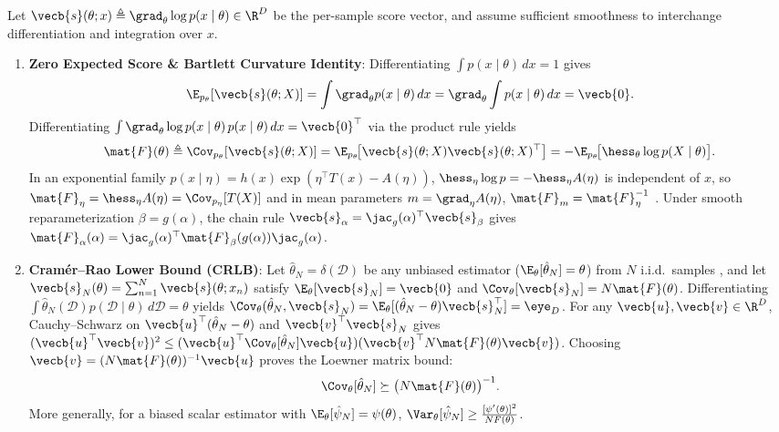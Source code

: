 \documentclass[../../../../master.tex]{subfiles}
\begin{document}
\begin{coremath}
Let $\vecb{s}(\theta; x) \triangleq \grad_\theta \log p(x \mid \theta) \in \R^D$ be the per-sample score vector, and assume sufficient smoothness to interchange differentiation and integration over $x$.
\begin{enumerate}
  \item \textbf{Zero Expected Score \& Bartlett Curvature Identity}: Differentiating $\int p(x\mid\theta)\,dx = 1$ gives
  \begin{equation}
  \E_{p_\theta}[\vecb{s}(\theta; X)] = \int \grad_\theta p(x\mid\theta)\,dx = \grad_\theta \int p(x\mid\theta)\,dx = \vecb{0}.
  \end{equation}
  Differentiating $\int \grad_\theta \log p(x\mid\theta)\, p(x\mid\theta)\,dx = \vecb{0}^\top$ via the product rule yields
  \begin{equation}
  \label{eq:asymp:fim}
  \mat{F}(\theta) \triangleq \Cov_{p_\theta}[\vecb{s}(\theta; X)] = \E_{p_\theta}\!\bigl[\vecb{s}(\theta; X)\vecb{s}(\theta; X)^\top\bigr] = -\E_{p_\theta}\!\bigl[\hess_\theta \log p(X \mid \theta)\bigr].
  \end{equation}
  In an exponential family $p(x\mid\eta) = h(x)\exp(\eta^\top T(x) - A(\eta))$, $\hess_\eta \log p = -\hess_\eta A(\eta)$ is independent of $x$, so $\mat{F}_\eta = \hess_\eta A(\eta) = \Cov_{p_\eta}[T(X)]$ and in mean parameters $m = \grad_\eta A(\eta)$, $\mat{F}_m = \mat{F}_\eta^{-1}$ . Under smooth reparameterization $\beta = g(\alpha)$, the chain rule $\vecb{s}_\alpha = \jac_g(\alpha)^\top \vecb{s}_\beta$ gives $\mat{F}_\alpha(\alpha) = \jac_g(\alpha)^\top \mat{F}_\beta(g(\alpha)) \jac_g(\alpha)$.
  \item \textbf{Cram\'er--Rao Lower Bound (CRLB)}: Let $\hat{\theta}_N = \delta(\mathcal{D})$ be any unbiased estimator ($\E_\theta[\hat{\theta}_N] = \theta$) from $N$ i.i.d.\ samples , and let $\vecb{s}_N(\theta) = \sum_{n=1}^N \vecb{s}(\theta; x_n)$ satisfy $\E_\theta[\vecb{s}_N] = \vecb{0}$ and $\Cov_\theta[\vecb{s}_N] = N\mat{F}(\theta)$. Differentiating $\int \hat{\theta}_N(\mathcal{D}) p(\mathcal{D}\mid\theta)\,d\mathcal{D} = \theta$ yields $\Cov_\theta(\hat{\theta}_N, \vecb{s}_N) = \E_\theta[(\hat{\theta}_N - \theta)\vecb{s}_N^\top] = \eye_D$. For any $\vecb{u}, \vecb{v} \in \R^D$, Cauchy--Schwarz on $\vecb{u}^\top(\hat{\theta}_N - \theta)$ and $\vecb{v}^\top \vecb{s}_N$ gives $(\vecb{u}^\top \vecb{v})^2 \le (\vecb{u}^\top \Cov_\theta[\hat{\theta}_N]\vecb{u})(\vecb{v}^\top N\mat{F}(\theta)\vecb{v})$. Choosing $\vecb{v} = (N\mat{F}(\theta))^{-1}\vecb{u}$ proves the Loewner matrix bound:
  \begin{equation}
  \label{eq:asymp:crlb}
  \Cov_\theta[\hat{\theta}_N] \succeq \bigl(N\mat{F}(\theta)\bigr)^{-1}.
  \end{equation}
  More generally, for a biased scalar estimator with $\E_\theta[\hat{\psi}_N] = \psi(\theta)$, $\Var_\theta[\hat{\psi}_N] \ge \frac{[\psi'(\theta)]^2}{N F(\theta)}$.
\end{enumerate}
\end{coremath}
\end{document}
